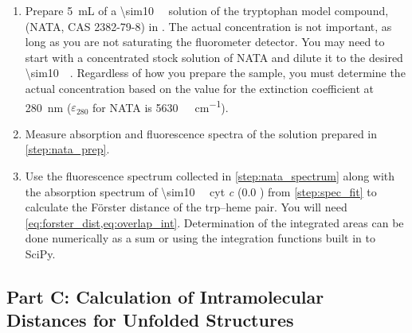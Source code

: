 \documentclass[nobib,nofonts,nols,nohyper]{tufte-handout}
\begin{document}
\begin{enumerate}
  \item Prepare \SI{5}{\mL} of a \SI{\sim10}{\micro\Molar} solution of the tryptophan model compound,  (NATA, CAS 2382-79-8) in . 
  The actual concentration is not important, as long as you are not saturating the fluorometer detector. 
  You may need to start with a concentrated stock solution of NATA and dilute it to the desired \SI{\sim10}{\micro\Molar}. 
  Regardless of how you prepare the sample, you must determine the actual concentration based on the value for the extinction coefficient at \SI{280}{\nm} (\( \varepsilon_{280} \) for NATA is \SI{5630}{\per\Molar\per\cm}).
  \label{step:nata_prep}
  \item Measure absorption and fluorescence spectra of the solution prepared in \cref{step:nata_prep}.
  \label{step:nata_spectrum} 
  \item Use the fluorescence spectrum collected in \cref{step:nata_spectrum} along with the absorption spectrum of \SI{\sim10}{\micro\Molar} cyt \emph{c} (\SI{0.0}{\Molar} ) from \cref{step:spec_fit} to calculate the Förster distance of the trp--heme pair. 
  You will need \cref{eq:forster_dist,eq:overlap_int}.
  Determination of the integrated areas can be done numerically as a sum or using the integration functions built in to SciPy.
  \label{step:dist_calc}
\end{enumerate}


\subsection{Part C: Calculation of Intramolecular Distances for Unfolded Structures} %
\label{sub:part_c_calculation_of_intramolecular_distances_for_unfolded_structures}
\end{document}
